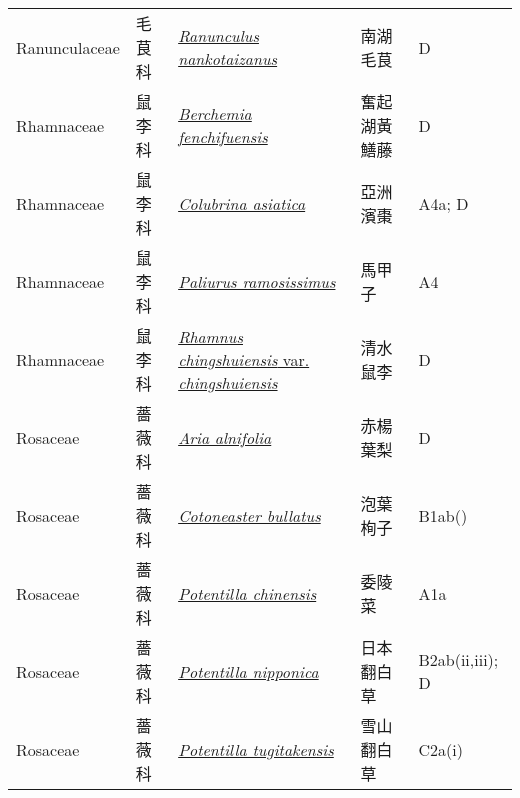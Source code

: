 {\begin{longtable}{p{2.5cm}p{2.5cm}p{4.5cm}p{2.5cm}p{3cm}}
    Ranunculaceae & 毛茛科 & \href{http://www.theplantlist.org/tpl1.1/search?q=Ranunculus+nankotaizanus}{\textit{Ranunculus nankotaizanus} } & 南湖毛茛 & D \index{Ranunculus@\textit{Ranunculus}!nankotaizanus@\textit{nankotaizanus}}  \index{南湖毛茛} \\
    Rhamnaceae & 鼠李科 & \href{http://www.theplantlist.org/tpl1.1/search?q=Berchemia+fenchifuensis}{\textit{Berchemia fenchifuensis} } & 奮起湖黃鱔藤 & D \index{Berchemia@\textit{Berchemia}!fenchifuensis@\textit{fenchifuensis}}  \index{奮起湖黃鱔藤} \\
    Rhamnaceae & 鼠李科 & \href{http://www.theplantlist.org/tpl1.1/search?q=Colubrina+asiatica}{\textit{Colubrina asiatica} } & 亞洲濱棗 & A4a; D \index{Colubrina@\textit{Colubrina}!asiatica@\textit{asiatica}}  \index{亞洲濱棗} \\
    Rhamnaceae & 鼠李科 & \href{http://www.theplantlist.org/tpl1.1/search?q=Paliurus+ramosissimus}{\textit{Paliurus ramosissimus} } & 馬甲子 & A4 \index{Paliurus@\textit{Paliurus}!ramosissimus@\textit{ramosissimus}}  \index{馬甲子} \\
    Rhamnaceae & 鼠李科 & \href{http://www.theplantlist.org/tpl1.1/search?q=Rhamnus+chingshuiensis+var.+chingshuiensis}{\textit{Rhamnus chingshuiensis} var. \textit{chingshuiensis} } & 清水鼠李 & D \index{Rhamnus@\textit{Rhamnus}!chingshuiensis@\textit{chingshuiensis}!var. chingshuiensis@var. \textit{chingshuiensis}}  \index{清水鼠李} \\
    Rosaceae & 薔薇科 & \href{http://www.theplantlist.org/tpl1.1/search?q=Aria+alnifolia}{\textit{Aria alnifolia} } & 赤楊葉梨 & D \index{Aria@\textit{Aria}!alnifolia@\textit{alnifolia}}  \index{赤楊葉梨} \\
    Rosaceae & 薔薇科 & \href{http://www.theplantlist.org/tpl1.1/search?q=Cotoneaster+bullatus}{\textit{Cotoneaster bullatus} } & 泡葉栒子 & B1ab() \index{Cotoneaster@\textit{Cotoneaster}!bullatus@\textit{bullatus}}  \index{泡葉栒子} \\
    Rosaceae & 薔薇科 & \href{http://www.theplantlist.org/tpl1.1/search?q=Potentilla+chinensis}{\textit{Potentilla chinensis} } & 委陵菜 & A1a \index{Potentilla@\textit{Potentilla}!chinensis@\textit{chinensis}}  \index{委陵菜} \\
    Rosaceae & 薔薇科 & \href{http://www.theplantlist.org/tpl1.1/search?q=Potentilla+nipponica}{\textit{Potentilla nipponica} } & 日本翻白草 & B2ab(ii,iii); D \index{Potentilla@\textit{Potentilla}!nipponica@\textit{nipponica}}  \index{日本翻白草} \\
    Rosaceae & 薔薇科 & \href{http://www.theplantlist.org/tpl1.1/search?q=Potentilla+tugitakensis}{\textit{Potentilla tugitakensis} } & 雪山翻白草 & C2a(i) \index{Potentilla@\textit{Potentilla}!tugitakensis@\textit{tugitakensis}}  \index{雪山翻白草} \\

\end{longtable}}
